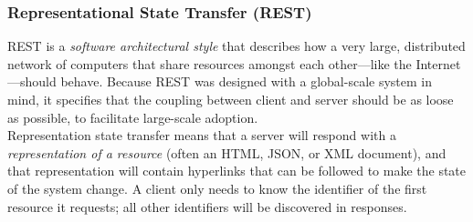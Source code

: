 \documentclass[12pt, titlepage]{article}
\begin{document}
\subsubsection{Representational State Transfer (REST)}

REST is a \textit{software architectural style} that describes how a very large, distributed network of computers that share resources amongst each other---like the Internet---should behave. Because REST was designed with a global-scale system in mind, it specifies that the coupling between client and server should be as loose as possible, to facilitate large-scale adoption. \\

Representation state transfer means that a server will respond with a \textit{representation of a resource} (often an HTML, JSON, or XML document), and that representation will contain hyperlinks that can be followed to make the state of the system change. A client only needs to know the identifier of the first resource it requests; all other identifiers will be discovered in responses. \\
\end{document}
